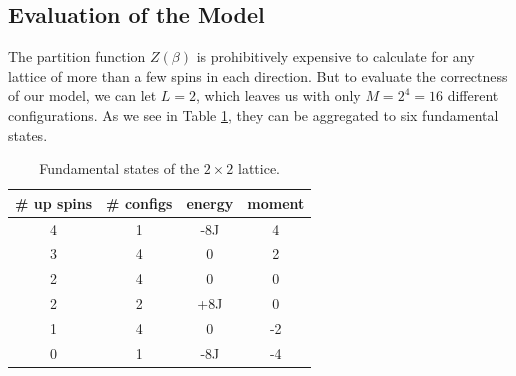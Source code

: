 \documentclass[]{article}
\begin{document}
\subsection{Evaluation of the Model} \label{sec:eval-model}

The partition function $Z(\beta)$ is prohibitively expensive to calculate for any lattice of more than a few spins in each direction. But to evaluate the correctness of our model, we can let $L=2$, which leaves us with only $M = 2^4 = 16$ different configurations. As we see in Table \ref{tab:2x2-states}, they can be aggregated to six fundamental states.

\begin{table}[!h]
	\caption{Fundamental states of the $2 \times 2$ lattice.}
	\label{tab:2x2-states}
	\begin{center}
		\begin{tabular}{c|c|c|c}
			\toprule
			\# up spins 		& \# configs		& energy	& moment	\\
			\midrule
			4				& 1				& -8J		& 4			\\
			3				& 4				&  0		& 2			\\
			2				& 4				&  0		& 0			\\
			2				& 2				& +8J		& 0			\\
			1				& 4				&  0		& -2		\\
			0				& 1				& -8J		& -4		\\
			\bottomrule
		\end{tabular}
	\end{center}
\end{table}
\end{document}
